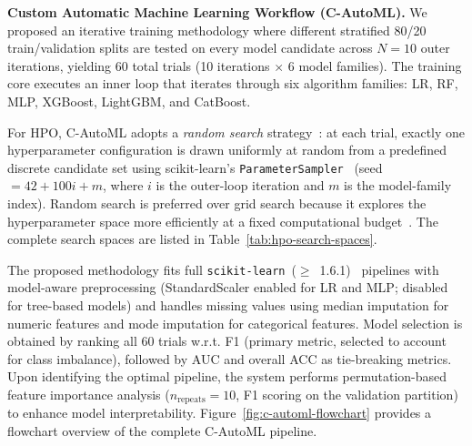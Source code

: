 \documentclass[diagnostics,article,submit,pdftex,moreauthors]{Definitions/mdpi}
\begin{document}
\textbf{Custom Automatic Machine Learning Workflow (C-AutoML).}
We proposed an iterative training methodology where different stratified
80/20 train/validation splits are tested on every model candidate
across $N = 10$ outer iterations, yielding 60 total trials
(10 iterations $\times$ 6 model families). The training core executes
an inner loop that iterates through six algorithm families: \ac{LR},
\ac{RF}, \ac{MLP}, XGBoost, LightGBM, and CatBoost.

For \ac{HPO}, C-AutoML adopts a \textit{random search}
strategy~\cite{bergstra2012random}: at each trial, exactly one
hyperparameter configuration is drawn uniformly at random from a
predefined discrete candidate set using scikit-learn's
\texttt{ParameterSampler}~\cite{sklearn-api} (seed $= 42 + 100i + m$,
where $i$ is the outer-loop iteration and $m$ is the model-family
index). Random search is preferred over grid search because it
explores the hyperparameter space more efficiently at a fixed
computational budget~\cite{bergstra2012random}. The complete search
spaces are listed in Table~\ref{tab:hpo-search-spaces}.

The proposed methodology fits full
\texttt{scikit-learn}~($\ge$~1.6.1)~\cite{sklearn-api} pipelines with
model-aware preprocessing (StandardScaler enabled for \ac{LR} and
\ac{MLP}; disabled for tree-based models) and handles missing values
using median imputation for numeric features and mode imputation for
categorical features. Model selection is obtained by ranking all
60 trials \ac{w.r.t.} \ac{F1} (primary metric, selected to account
for class imbalance), followed by \ac{AUC} and overall \ac{ACC} as
tie-breaking metrics. Upon identifying the optimal pipeline, the
system performs permutation-based feature importance analysis
($n_{\mathrm{repeats}} = 10$, \ac{F1} scoring on the validation
partition) to enhance model interpretability.
Figure~\ref{fig:c-automl-flowchart} provides a flowchart
  overview of the complete \ac{C-AutoML} pipeline.
\end{document}
